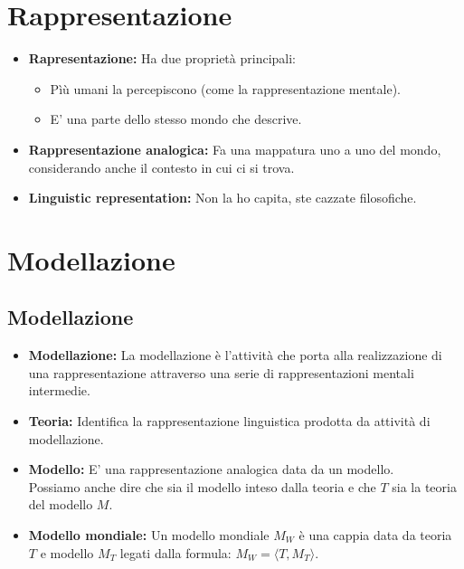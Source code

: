 \documentclass[../main.tex]{subfiles}
\begin{document}
    \section{Rappresentazione}
    \begin{itemize}
        \item \textbf{Rapresentazione:} Ha due proprietà principali:
            \begin{itemize}
                \item Pìù umani la percepiscono (come la rappresentazione mentale).
                \item E' una parte dello stesso mondo che descrive.
            \end{itemize}
        \item \textbf{Rappresentazione analogica:} Fa una mappatura uno a uno del mondo, considerando anche il contesto in cui ci si trova.
        \item \textbf{Linguistic representation:} Non la ho capita, ste cazzate filosofiche.
    \end{itemize}

    \section{Modellazione}
    \subsection{Modellazione}
    \begin{itemize}
        \item \textbf{Modellazione:} La modellazione è l'attività che porta alla realizzazione di una rappresentazione attraverso una serie di rappresentazioni mentali intermedie.
        \item \textbf{Teoria:} Identifica la rappresentazione linguistica prodotta da attività di modellazione.
        \item \textbf{Modello:} E' una rappresentazione analogica data da un modello.\\
            Possiamo anche dire che sia il modello inteso dalla teoria e che $T$ sia la teoria del modello $M$.
        \item \textbf{Modello mondiale:} Un modello mondiale $M_W$ è una cappia data da teoria $T$ e modello $M_T$ legati dalla formula: $M_W=\langle T, M_T \rangle$.
        \end{itemize}
\end{document}
